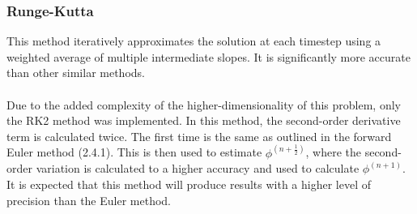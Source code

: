 \documentclass{homework}
\begin{document}
\subsubsection{\textbf{Runge-Kutta}}
This method iteratively approximates the solution at each timestep using a weighted average of multiple intermediate slopes. It is significantly more accurate than other similar methods.
\\ \\ \noindent
Due to the added complexity of the higher-dimensionality of this problem, only the RK2 method was implemented. In this method, the second-order derivative term is calculated twice. The first time is the same as outlined in the forward Euler method (2.4.1). This is then used to estimate $\phi^{(n+\frac{1}{2})}$, where the second-order variation is calculated to a higher accuracy and used to calculate $\phi^{(n+1)}$. It is expected that this method will produce results with a higher level of precision than the Euler method.
\end{document}
